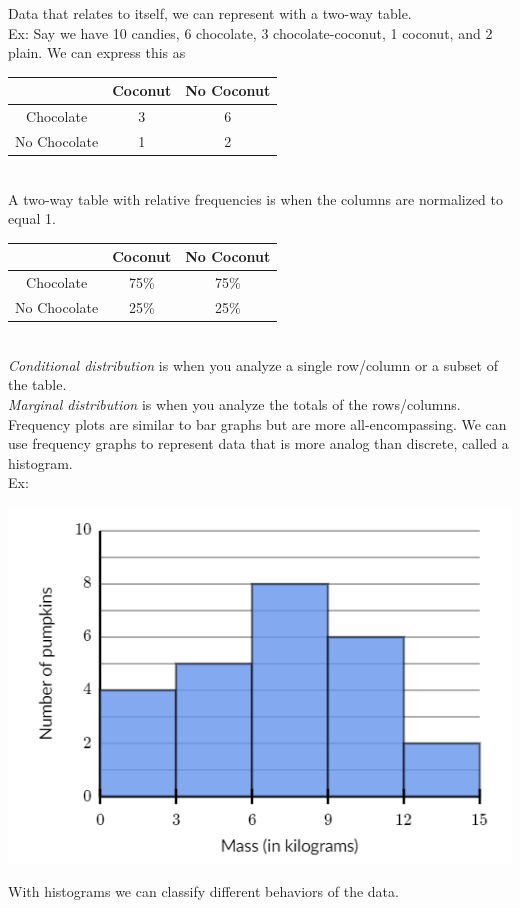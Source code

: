 Data that relates to itself, we can represent with a two-way table.\\
Ex: Say we have 10 candies, 6 chocolate, 3 chocolate-coconut, 1 coconut, and 2 plain. We can express this as\\
\begin{tabular}{c|c|c}
    & Coconut & No Coconut\\
    \hline
    Chocolate & 3 & 6\\
    No Chocolate & 1 & 2
\end{tabular}\\
A two-way table with relative frequencies is when the columns are normalized to equal 1.\\
\begin{tabular}{c|c|c}
    & Coconut & No Coconut\\
    \hline
    Chocolate & 75\% & 75\%\\
    No Chocolate & 25\% & 25\%
\end{tabular}\\
\textit{Conditional distribution} is when you analyze a single row/column or a subset of the table.\\
\textit{Marginal distribution} is when you analyze the totals of the rows/columns.\\
Frequency plots are similar to bar graphs but are more all-encompassing. We can use frequency graphs to represent data that is more analog than discrete, called a histogram.\\
Ex:\\
\centerline{\includegraphics[scale=0.7]{FundamentalsPictures/histogram.png}}
With histograms we can classify different behaviors of the data.\\
